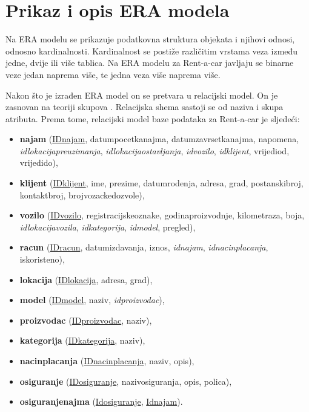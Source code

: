 \documentclass[]{foi}
\begin{document}
\section{Prikaz i opis ERA modela}

Na ERA modelu se prikazuje podatkovna struktura objekata i njihovi odnosi, odnosno kardinalnosti. Kardinalnost se postiže različitim vrstama veza između jedne, dvije ili više tablica. Na ERA modelu za Rent-a-car javljaju se binarne veze jedan naprema više, te jedna veza više naprema više.

Nakon što je izrađen ERA model on se pretvara u relacijski model. On je zasnovan na teoriji skupova \cite{tbp}. Relacijska shema sastoji se od naziva i skupa atributa. Prema tome, relacijski model baze podataka za Rent-a-car je sljedeći:

\begin{itemize}
  \item \textbf{najam} (\underline{IDnajam}, datumpocetkanajma, datumzavrsetkanajma, napomena, \textit{idlokacijapreuzimanja}, \textit{idlokacijaostavljanja}, \textit{idvozilo}, \textit{idklijent}, vrijediod, vrijedido),
  \item \textbf{klijent} (\underline{IDklijent}, ime, prezime, datumrodenja, adresa, grad, postanskibroj, kontaktbroj, brojvozackedozvole),
  \item \textbf{vozilo} (\underline{IDvozilo}, registracijskeoznake, godinaproizvodnje, kilometraza, boja, \textit{idlokacijavozila}, \textit{idkategorija}, \textit{idmodel}, pregled),
  \item \textbf{racun} (\underline{IDracun}, datumizdavanja, iznos, \textit{idnajam}, \textit{idnacinplacanja}, iskoristeno),
  \item \textbf{lokacija} (\underline{IDlokacija}, adresa, grad),
  \item \textbf{model} (\underline{IDmodel}, naziv, \textit{idproizvodac}),
  \item \textbf{proizvodac} (\underline{IDproizvodac}, naziv),
  \item \textbf{kategorija} (\underline{IDkategorija}, naziv),
  \item \textbf{nacinplacanja} (\underline{IDnacinplacanja}, naziv, opis),
  \item \textbf{osiguranje} (\underline{IDosiguranje}, nazivosiguranja, opis, polica),
  \item \textbf{osiguranjenajma} (\underline{Idosiguranje}, \underline{Idnajam}).
\end{itemize}
\end{document}
